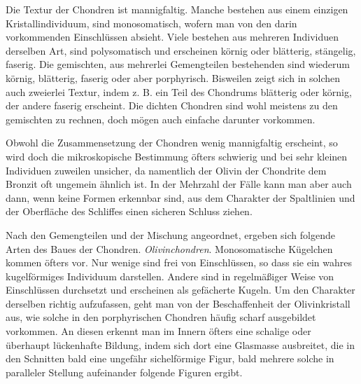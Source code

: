 \documentclass[a4paper, 12pt, oneside]{article}
\begin{document}
Die Textur der Chondren ist mannigfaltig. Manche bestehen aus einem einzigen Kristallindividuum, sind monosomatisch, wofern man von den darin vorkommenden Einschlüssen absieht. Viele bestehen aus mehreren Individuen derselben Art, sind polysomatisch und erscheinen körnig oder blätterig, stängelig, faserig. Die gemischten, aus mehrerlei Gemengteilen bestehenden sind wiederum körnig, blätterig, faserig oder aber porphyrisch. Bisweilen zeigt sich in solchen auch zweierlei Textur, indem z. B. ein Teil des Chondrums blätterig oder körnig, der andere faserig erscheint. Die dichten Chondren sind wohl meistens zu den gemischten zu rechnen, doch mögen auch einfache darunter vorkommen.

Obwohl die Zusammensetzung der Chondren wenig mannigfaltig erscheint, so wird doch die mikroskopische Bestimmung öfters schwierig und bei sehr kleinen Individuen zuweilen unsicher, da namentlich der Olivin der Chondrite dem Bronzit oft ungemein ähnlich ist. In der Mehrzahl der Fälle kann man aber auch dann, wenn keine Formen erkennbar sind, aus dem Charakter der Spaltlinien und der Oberfläche des Schliffes einen sicheren Schluss ziehen.

Nach den Gemengteilen und der Mischung angeordnet, ergeben sich folgende Arten des Baues der Chondren. \emph{Olivinchondren}. Monosomatische Kügelchen kommen öfters vor. Nur wenige sind frei von Einschlüssen, so dass sie ein wahres kugelförmiges Individuum darstellen. Andere sind in regelmäßiger Weise von Einschlüssen durchsetzt und erscheinen als gefächerte Kugeln. Um den Charakter derselben richtig aufzufassen, geht man von der Beschaffenheit der Olivinkristall aus, wie solche in den porphyrischen Chondren häufig scharf ausgebildet vorkommen. An diesen erkennt man im Innern öfters eine schalige oder überhaupt lückenhafte Bildung, indem sich dort eine Glasmasse ausbreitet, die in den Schnitten bald eine ungefähr sichelförmige Figur, bald mehrere solche in paralleler Stellung aufeinander folgende Figuren ergibt.
\end{document}
